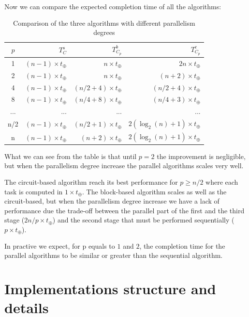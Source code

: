 \documentclass{article}
\begin{document}
Now we can compare the expected completion time of all the algorithms:
\begin{table}[h]
\centering
\begin{tabular}{|c|r|r|r|}
\hline
 $p$ & $T^s_{C}$                & $T^b_{C_p}$                   & $T^c_{C_p}$ \\ \hline
  1  & $(n-1)\times t_{\oplus}$ & $n \times t_{\oplus}$         & $2n \times t_{\oplus}$\\ \hline
  2  & $(n-1)\times t_{\oplus}$ & $n \times t_{\oplus}$         & $(n+2) \times t_{\oplus}$ \\ \hline
  4  & $(n-1)\times t_{\oplus}$ & $(n/2 + 4) \times t_{\oplus}$ & $(n/2+4) \times t_{\oplus}$ \\ \hline
  8  & $(n-1)\times t_{\oplus}$ & $(n/4 + 8) \times t_{\oplus}$ & $(n/4+3) \times t_{\oplus}$ \\ \hline
 ... & ...                      & ...                           & ... \\ \hline
 n/2 & $(n-1)\times t_{\oplus}$ & $(n/2+1)\times t_{\oplus}$    & $2(\log_{2}(n) + 1) \times t_{\oplus}$ \\ \hline
  n  & $(n-1)\times t_{\oplus}$ & $(n+2)\times t_{\oplus}$      & $2(\log_{2}(n) + 1) \times t_{\oplus}$ \\ \hline
\end{tabular}
\caption{Comparison of the three algorithms with different parallelism degrees}
\end{table}

What we can see from the table is that until $p = 2$ the improvement is negligible, but when the parallelism degree increase the parallel algorithms scales very well.

The circuit-based algorithm reach its best performance for $p \geq n/2$ where each task is computed in $1 \times t_{\oplus}$. 
The block-based algorithm scales as well as the circuit-based, but when the parallelism degree increase we have a lack of performance due the trade-off between the parallel part of the first and the third stage ($2n/p \times t_{\oplus}$) and the second stage that must be performed sequentially ($p \times t_{\oplus}$).

In practive we expect, for p equals to $1$ and $2$, the completion time for the parallel algorithms to be similar or greater than the sequential algorithm. 

\section{Implementations structure and details}
\end{document}
